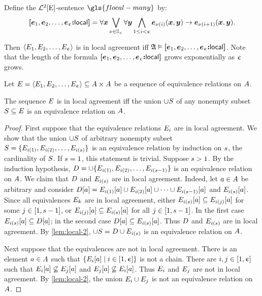 \begin{definition}
Define the $\mathcal{L}^{2}[\mathrm{E}]$-sentence $\gls{flocal-many}$ by:
\[
  {\bm{[}\bm{e}_{1},\bm{e}_{2},\dots,\bm{e}_{\upepsilon}\mathord{\bm{:}}\mathsf{local}\bm{]}} = \forall\bm{x}
  \bigvee_{\nu \in \mathbb{S}_{\upepsilon}}
  \forall\bm{y} \bigwedge_{1 \leq i < \upepsilon}
  \bm{e}_{\nu(i)}(\bm{x},\bm{y}) \rightarrow \bm{e}_{\nu(i+1)}(\bm{x},\bm{y}).
\]
\end{definition}
Then $\left\langle E_{1},E_{2},\dots,E_{\upepsilon} \right\rangle$ is in local agreement iff
$\mathfrak{A} \vDash {\bm{[}\bm{e}_{1},\bm{e}_{2},\dots,\bm{e}_{\upepsilon}\mathord{\bm{:}}\mathsf{local}\bm{]}}$.
Note that the length of the formula ${\bm{[}\bm{e}_{1},\bm{e}_{2},\dots,\bm{e}_{\upepsilon}\mathord{\bm{:}}\mathsf{local}\bm{]}}$ grows
exponentially as $\upepsilon$ grows.

Let $E = \left\langle E_{1},E_{2},\dots,E_{\upepsilon} \right\rangle \subseteq {A\times A}$
be a sequence of equivalence relations on $A$.
\begin{theorem}\label{thm:local}
The sequence $E$ is in local agreement iff
the union $\cup S$ of any nonempty subset $S \subseteq E$
is an equivalence relation on $A$.
\end{theorem}
\begin{proof}
First suppose that the equivalence relations $E_{i}$ are in local agreement.
We show that the union $\cup S$ of arbitrary nonempty subset 
$S = \{E_{i(1)}, E_{i(2)}, \dots, E_{i(s)}\}$ is
an equivalence relation by induction on $s$, the cardinality of $S$. If
$s = 1$, this statement is trivial.
Suppose $s > 1$.
By the induction hypothesis, $D = \cup \{E_{i(1)},
E_{i(2)}, \dots, E_{i(s-1)}\}$ is an equivalence relation on
$A$.
We claim that $D$ and $E_{i(s)}$ are in local agreement.
Indeed, let $a \in A$ be arbitrary and consider
$D[a] = E_{i(1)}[a] \cup E_{i(2)}[a] \cup \dots \cup
E_{i(s - 1)}[a]$ and $E_{i(s)}[a]$.
Since all equivalences $E_{k}$
are in local agreement, either
$E_{i(s)}[a] \subseteq E_{i(j)}[a]$ 
for some $j \in [1, s-1]$,
or $E_{i(j)}[a] \subseteq E_{i(s)}[a]$
for all $j \in [1, s-1]$.
In the first case $E_{i(s)}[a] \subseteq D[a]$;
in the second case $D[a] \subseteq E_{i(s)}[a]$.
Thus $D$ and $E_{i(s)}$ are in local agreement.
By \cref{lem:local-2}, $\cup S = D \cup E_{i(s)}$ is an
equivalence relation on $A$.

Next suppose that the equivalences are not in local agreement.
There is an element $a \in A$ such that
$\left\{E_{i}[a]\mathrel{}\middle|\mathrel{}i \in [1, \upepsilon]\right\}$ is not a chain. 
There are $i, j \in [1, \upepsilon]$ such that
$E_{i}[a] \not\subseteq E_{j}[a]$ and
$E_{j}[a] \not\subseteq E_{i}[a]$.
Thus $E_{i}$ and $E_{j}$ are not in local agreement.
By \cref{lem:local-2}, the union $E_{i} \cup E_{j}$ is not an
equivalence relation on $A$.
\end{proof}

